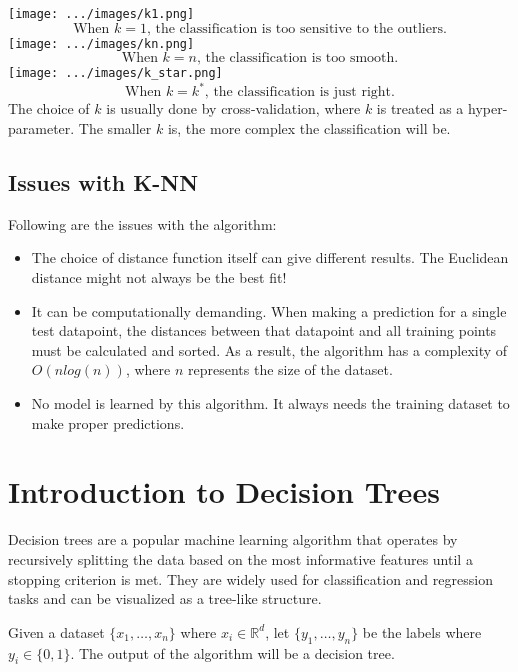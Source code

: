 \documentclass[
]{article}
\providecommand{\tightlist}{%
  \setlength{\itemsep}{0pt}\setlength{\parskip}{0pt}}
\begin{document}
\texttt{[image: .../images/k1.png]} \[
\text{When }k=1\text{, the classification is too sensitive to the outliers.}
\] \texttt{[image: .../images/kn.png]} \[
\text{When }k=n\text{, the classification is too smooth.}
\] \texttt{[image: .../images/k\_star.png]} \[
\text{When }k=k^*\text{, the classification is just right.}
\] The choice of \(k\) is usually done by cross-validation, where \(k\)
is treated as a hyper-parameter. The smaller \(k\) is, the more complex
the classification will be.

\newpage
\hypertarget{issues-with-k-nn}{%
\subsection{Issues with K-NN}\label{issues-with-k-nn}}

Following are the issues with the algorithm:

\begin{itemize}
\tightlist
\item
  The choice of distance function itself can give different results. The
  Euclidean distance might not always be the best fit!
\item
  It can be computationally demanding. When making a prediction for a
  single test datapoint, the distances between that datapoint and all
  training points must be calculated and sorted. As a result, the
  algorithm has a complexity of \(O(nlog(n))\), where \(n\) represents
  the size of the dataset.
\item
  No model is learned by this algorithm. It always needs the training
  dataset to make proper predictions.
\end{itemize}

\newpage
\hypertarget{introduction-to-decision-trees}{%
\section{Introduction to Decision
Trees}\label{introduction-to-decision-trees}}

Decision trees are a popular machine learning algorithm that operates by
recursively splitting the data based on the most informative features
until a stopping criterion is met. They are widely used for
classification and regression tasks and can be visualized as a tree-like
structure.

Given a dataset \(\{x_1, \ldots, x_n\}\) where \(x_i \in \mathbb{R}^d\),
let \(\{y_1, \ldots, y_n\}\) be the labels where \(y_i \in \{0, 1\}\).
The output of the algorithm will be a decision tree.
\end{document}
